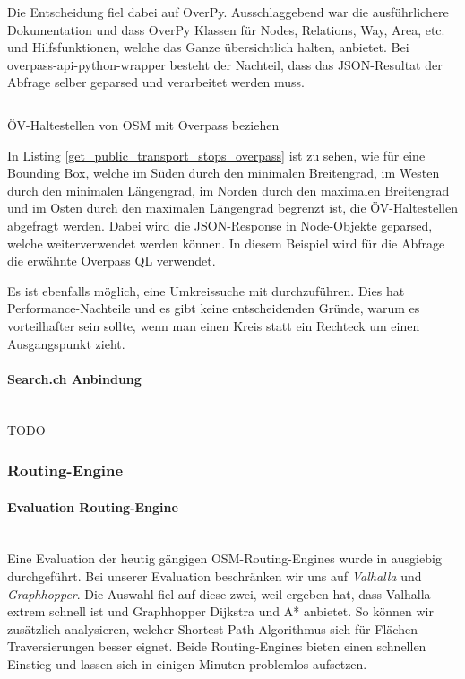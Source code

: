 Die Entscheidung fiel dabei auf OverPy. Ausschlaggebend war die ausführlichere Dokumentation und dass OverPy Klassen für Nodes, Relations, Way, Area, etc. und Hilfsfunktionen, welche das Ganze übersichtlich halten, anbietet. Bei overpass-api-python-wrapper besteht der Nachteil, dass das JSON-Resultat der Abfrage selber geparsed und verarbeitet werden muss.

\begin{listing}[ht]
    \inputminted{python}{projectdoc/listing/get_public_transport_stops_overpass.py}
    \caption{ÖV-Haltestellen von \acs{OSM} mit Overpass beziehen}
    \label{get_public_transport_stops_overpass}
\end{listing}

In Listing \ref{get_public_transport_stops_overpass} ist zu sehen, wie für eine Bounding Box, welche im Süden durch den minimalen Breitengrad, im Westen durch den minimalen Längengrad, im Norden durch den maximalen Breitengrad und im Osten durch den maximalen Längengrad begrenzt ist, die ÖV-Haltestellen abgefragt werden. Dabei wird die JSON-Response in Node-Objekte geparsed, welche weiterverwendet werden können. In diesem Beispiel wird für die Abfrage die erwähnte Overpass QL verwendet.

Es ist ebenfalls möglich, eine Umkreissuche mit  durchzuführen. Dies hat Performance-Nachteile und es gibt keine entscheidenden Gründe, warum es vorteilhafter sein sollte, wenn man einen Kreis statt ein Rechteck um einen Ausgangspunkt zieht.

\paragraph{Search.ch Anbindung}\label{architektur:Search.ch Anbindung}~\\

TODO

\subsubsection{Routing-Engine}
\label{architektur:Routing-Engine}

\paragraph{Evaluation Routing-Engine}~\\
\label{architektur:Evaluation Routing-Engine}
Eine Evaluation der heutig gängigen \ac{OSM}-Routing-Engines wurde in \cite{eval_routing_engine} ausgiebig durchgeführt. Bei unserer Evaluation beschränken wir uns auf \emph{Valhalla}\cite{valhalla} und \emph{Graphhopper}\cite{graphhopper}. Die Auswahl fiel auf diese zwei, weil \cite{eval_routing_engine} ergeben hat, dass Valhalla extrem schnell ist und Graphhopper Dijkstra und A* anbietet. So können wir zusätzlich analysieren, welcher Shortest-Path-Algorithmus sich für Flächen-Traversierungen besser eignet. Beide Routing-Engines bieten einen schnellen Einstieg und lassen sich in einigen Minuten problemlos aufsetzen.


